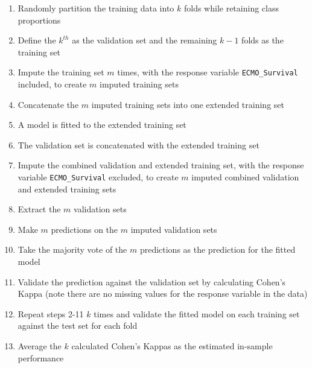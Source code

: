 \documentclass[12pt,]{article}
\providecommand{\tightlist}{%
  \setlength{\itemsep}{0pt}\setlength{\parskip}{0pt}}
\begin{document}
\begin{enumerate}
\def\labelenumi{\arabic{enumi}.}
\tightlist
\item
  Randomly partition the training data into \(k\) folds while retaining
  class proportions
\item
  Define the \(k^{th}\) as the validation set and the remaining \(k-1\)
  folds as the training set
\item
  Impute the training set \(m\) times, with the response variable
  \texttt{ECMO\_Survival} included, to create \(m\) imputed training
  sets
\item
  Concatenate the \(m\) imputed training sets into one extended training
  set
\item
  A model is fitted to the extended training set
\item
  The validation set is concatenated with the extended training set
\item
  Impute the combined validation and extended training set, with the
  response variable \texttt{ECMO\_Survival} excluded, to create \(m\)
  imputed combined validation and extended training sets
\item
  Extract the \(m\) validation sets
\item
  Make \(m\) predictions on the \(m\) imputed validation sets
\item
  Take the majority vote of the \(m\) predictions as the prediction for
  the fitted model
\item
  Validate the prediction against the validation set by calculating
  Cohen's Kappa (note there are no missing values for the response
  variable in the data)
\item
  Repeat steps 2-11 \(k\) times and validate the fitted model on each
  training set against the test set for each fold
\item
  Average the \(k\) calculated Cohen's Kappas as the estimated in-sample
  performance
\end{enumerate}
\end{document}
